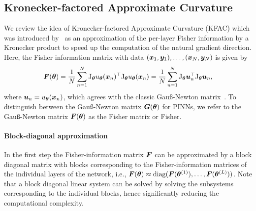 \subsection{Kronecker-factored Approximate Curvature}


We review the idea of Kronecker-factored Approximate Curvature (KFAC) which was introduced by~\citet{heskes2000natural, martens2015optimizing} as an approximation of the per-layer Fisher information by a Kronecker product to speed up the computation of the natural gradient direction. 
Here, the Fisher information matrix with data $({\bm{x}}_1, {\bm{y}}_1), \dots, ({\bm{x}}_N, {\bm{y}}_N)$ is given by 
\begin{equation}
  {\bm{F}}({\bm{\theta}}) = \frac1N\sum_{n=1}^N \mathrm{J}_{{\bm{\theta}}} u_{{\bm{\theta}}}({\bm{x}}_n)^\top \mathrm{J}_{{\bm{\theta}}} u_{{\bm{\theta}}}({\bm{x}}_n) = \frac1N\sum_{n=1}^N \mathrm{J}_{{\bm{\theta}}} {\bm{u}}_n^\top \mathrm{J}_{{\bm{\theta}}} {\bm{u}}_n
  ,
 \end{equation}
where ${\bm{u}}_n = u_{\bm{\theta}}({\bm{x}}_n)$, which agrees with the %
classic Gauß-Newton matrix~\citep{martens2020new, eschenhagen2023kroneckerfactored}. 
To distinguish between the Gauß-Newton matrix ${\bm{G}}({\bm{\theta}})$ for PINNs, we refer to the Gauß-Newton matrix ${\bm{F}}({\bm{\theta}})$ as the Fisher matrix or Fisher. 


\paragraph{Block-diagonal approximation}
In the first step the Fisher-information matrix ${\bm{F}}$ can be approximated by a block diagonal matrix with blocks corresponding to the Fisher-information matrices of the individual layers of the network, i.e., ${\bm{F}}({\bm{\theta}}) \approx \operatorname{diag}({\bm{F}}({\bm{\theta}}^{(1)}), \dots, {\bm{F}}({\bm{\theta}}^{(L)}))$. 
Note that a block diagonal linear system can be solved by solving the subsystems corresponding to the individual blocks, hence significantly reducing the computational complexity. 

